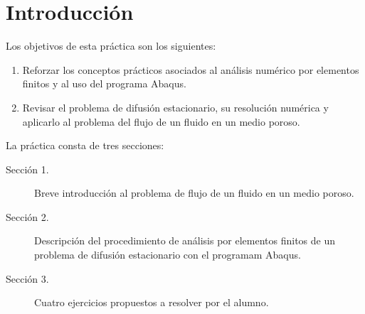 \section*{Introducción}
 Los objetivos de esta
práctica son los siguientes:
\begin{enumerate}
\item Reforzar los conceptos prácticos asociados al análisis numérico
  por elementos finitos y al uso del programa Abaqus.
\item Revisar el problema de difusión estacionario, su resolución
  numérica y aplicarlo al problema del flujo de un fluido en un medio
  poroso.
\end{enumerate}

La práctica consta de tres secciones:
\begin{description}
\item[Sección 1.] Breve introducción al problema de flujo de un fluido
  en un medio poroso.
\item[Sección 2.] Descripción del procedimiento de análisis por
  elementos finitos de un problema de difusión estacionario con el
  programam Abaqus.
\item[Sección 3.] Cuatro ejercicios propuestos a resolver por el alumno.
\end{description}